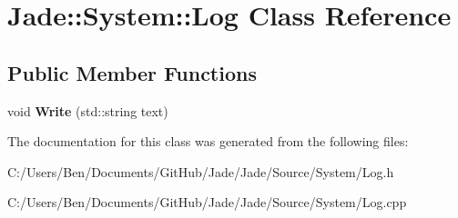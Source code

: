 \hypertarget{class_jade_1_1_system_1_1_log}{}\section{Jade\+:\+:System\+:\+:Log Class Reference}
\label{class_jade_1_1_system_1_1_log}
\subsection*{Public Member Functions}
\begin{DoxyCompactItemize}
\item 
\hypertarget{class_jade_1_1_system_1_1_log_a0ae495557ee5be6096556c2ea5d7480c}{}void {\bfseries Write} (std\+::string text)\label{class_jade_1_1_system_1_1_log_a0ae495557ee5be6096556c2ea5d7480c}

\end{DoxyCompactItemize}


The documentation for this class was generated from the following files\+:\begin{DoxyCompactItemize}
\item 
C\+:/\+Users/\+Ben/\+Documents/\+Git\+Hub/\+Jade/\+Jade/\+Source/\+System/Log.\+h\item 
C\+:/\+Users/\+Ben/\+Documents/\+Git\+Hub/\+Jade/\+Jade/\+Source/\+System/Log.\+cpp\end{DoxyCompactItemize}
